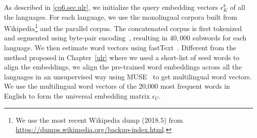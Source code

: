 As described in \textsection\ref{cp6.sec.ulr}, we initialize the query embedding vectors $\epsilon_{K}^k$ of all the languages. For each language, we use the monolingual corpora built from Wikipedia\footnote{
We use the most recent Wikipedia dump (2018.5) from \url{https://dumps.wikimedia.org/backup-index.html}. 
}
and the parallel corpus. The concatenated corpus is first tokenized and segmented using byte-pair encoding~\citep[BPE,][]{sennrich2016edinburgh}, resulting in $40,000$ subwords for each language. We then estimate word vectors using fastText~\citep{bojanowski2016enriching}. Different from the method proposed in Chapter~\ref{ulr} where we used a short-list of seed words to align the embeddings, we align the pre-trained word embeddings across all the languages in an unsupervised way using MUSE~\citep{alexis2018word} to get multilingual word vectors. We use the multilingual word vectors of the 20,000 most frequent words in English to form the universal embedding matrix $\epsilon_U$. 








